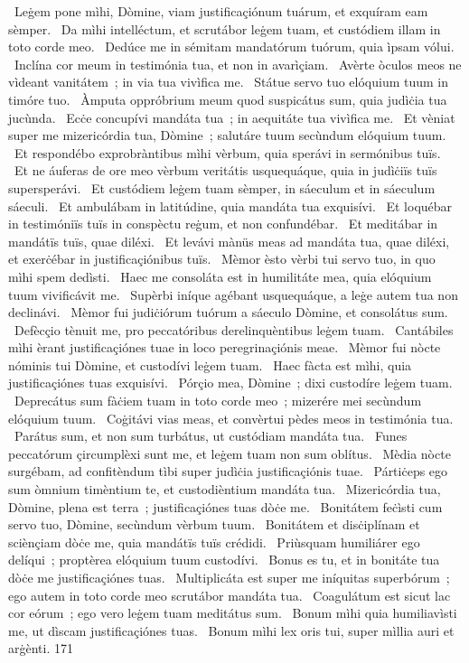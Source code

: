 {~Leġem pone mìhi, Dòmine, viam justificaçiónum tuárum, et exquíram eam sèmper.
~Da mìhi intelléctum, et scrutábor leġem tuam, et custódiem illam in toto corde meo.
~Dedúce me in sémitam mandatórum tuórum, quia ìpsam vólui.
~Inclína cor meum in testimónia tua, et non in avarìçiam.
~Avèrte òculos meos ne vìdeant vanitátem~; in via tua vivìfica me.
~Státue servo tuo elóquium tuum in timóre tuo.
~Àmputa oppróbrium meum quod suspicátus sum, quia judìċia tua jucùnda.
~Ecċe concupívi mandáta tua~; in aequitáte tua vivìfica me.
~Et vèniat super me mizericórdia tua, Dòmine~; salutáre tuum secùndum elóquium tuum.
~Et respondébo exprobràntibus mìhi vèrbum, quia sperávi in sermónibus tuïs.
~Et ne áuferas de ore meo vèrbum veritátis usquequáque, quia in judìċiïs tuïs supersperávi.
~Et custódiem leġem tuam sèmper, in sáeculum et in sáeculum sáeculi.
~Et ambulábam in latitúdine, quia mandáta tua exquisívi.
~Et loquébar in testimóniïs tuïs in conspèctu reġum, et non confundébar.
~Et meditábar in mandátïs tuïs, quae diléxi.
~Et levávi mànüs meas ad mandáta tua, quae diléxi, et exerċébar in justificaçiónibus tuïs.
~Mèmor èsto vèrbi tui servo tuo, in quo mìhi spem dedìsti.
~Haec me consoláta est in humilitáte mea, quia elóquium tuum vivificávit me.
~Supèrbi iníque agébant usquequáque, a leġe autem tua non declinávi.
~Mèmor fui judiċiórum tuórum a sáeculo Dòmine, et consolátus sum.
~Defècçio tènuit me, pro peccatóribus derelinquèntibus leġem tuam.
~Cantábiles mìhi èrant justificaçiónes tuae in loco peregrinaçiónis meae.
~Mèmor fui nòcte nóminis tui Dòmine, et custodívi leġem tuam.
~Haec fàcta est mìhi, quia justificaçiónes tuas exquisívi.
~Pórçio mea, Dòmine~; dixi custodíre leġem tuam.
~Deprecátus sum fàċiem tuam in toto corde meo~; mizerére mei secùndum elóquium tuum.
~Coġitávi vias meas, et convèrtui pèdes meos in testimónia tua.
~Parátus sum, et non sum turbátus, ut custódiam mandáta tua.
~Funes peccatórum çircumplèxi sunt me, et leġem tuam non sum oblítus.
~Mèdia nòcte surgébam, ad confitèndum tìbi super judìċia justificaçiónis tuae.
~Pártiċeps ego sum òmnium timèntium te, et custodièntium mandáta tua.
~Mizericórdia tua, Dòmine, plena est terra~; justificaçiónes tuas dòċe me.
~Bonitátem feċìsti cum servo tuo, Dòmine, secùndum vèrbum tuum.
~Bonitátem et disċiplínam et sciènçiam dòċe me, quia mandátïs tuïs crédidi.
~Priùsquam humiliárer ego delíqui~; proptèrea elóquium tuum custodívi.
~Bonus es tu, et in bonitáte tua dòċe me justificaçiónes tuas.
~Multiplicáta est super me iníquitas superbórum~; ego autem in toto corde meo scrutábor mandáta tua.
~Coagulátum est sicut lac cor eórum~; ego vero leġem tuam meditátus sum.
~Bonum mìhi quia humiliavìsti me, ut dìscam justificaçiónes tuas.
~Bonum mìhi lex oris tui, super mìllia auri et arġènti.
}
{17}{1}
